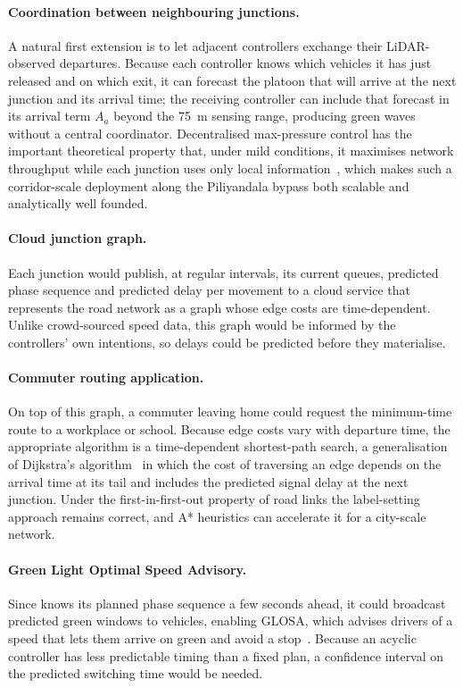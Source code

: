 \paragraph{Coordination between neighbouring junctions.} A natural first extension is to let adjacent \prism{} controllers exchange their LiDAR-observed departures. Because each controller knows which vehicles it has just released and on which exit, it can forecast the platoon that will arrive at the next junction and its arrival time; the receiving controller can include that forecast in its arrival term $A_a$ beyond the 75~m sensing range, producing green waves without a central coordinator. Decentralised max-pressure control has the important theoretical property that, under mild conditions, it maximises network throughput while each junction uses only local information~\cite{varaiya2013maxpressure,wongpiromsarn2012distributed}, which makes such a corridor-scale deployment along the Piliyandala bypass both scalable and analytically well founded.

\paragraph{Cloud junction graph.} Each junction would publish, at regular intervals, its current queues, predicted phase sequence and predicted delay per movement to a cloud service that represents the road network as a graph whose edge costs are time-dependent. Unlike crowd-sourced speed data, this graph would be informed by the controllers' own intentions, so delays could be predicted before they materialise.

\paragraph{Commuter routing application.} On top of this graph, a commuter leaving home could request the minimum-time route to a workplace or school. Because edge costs vary with departure time, the appropriate algorithm is a time-dependent shortest-path search, a generalisation of Dijkstra's algorithm~\cite{dijkstra1959} in which the cost of traversing an edge depends on the arrival time at its tail and includes the predicted signal delay at the next junction. Under the first-in-first-out property of road links the label-setting approach remains correct, and A* heuristics can accelerate it for a city-scale network.

\paragraph{Green Light Optimal Speed Advisory.} Since \prism{} knows its planned phase sequence a few seconds ahead, it could broadcast predicted green windows to vehicles, enabling GLOSA, which advises drivers of a speed that lets them arrive on green and avoid a stop~\cite{katsaros2011glosa}. Because an acyclic controller has less predictable timing than a fixed plan, a confidence interval on the predicted switching time would be needed.

